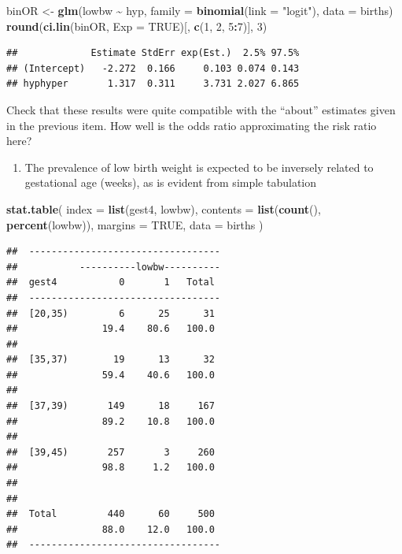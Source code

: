 \documentclass[
]{book}
\newenvironment{Shaded}{\begin{snugshade}}{\end{snugshade}}
\newcommand{\AttributeTok}[1]{\textcolor[rgb]{0.13,0.29,0.53}{#1}}
\newcommand{\ConstantTok}[1]{\textcolor[rgb]{0.56,0.35,0.01}{#1}}
\newcommand{\DecValTok}[1]{\textcolor[rgb]{0.00,0.00,0.81}{#1}}
\newcommand{\FunctionTok}[1]{\textcolor[rgb]{0.13,0.29,0.53}{\textbf{#1}}}
\newcommand{\NormalTok}[1]{#1}
\newcommand{\OtherTok}[1]{\textcolor[rgb]{0.56,0.35,0.01}{#1}}
\newcommand{\SpecialCharTok}[1]{\textcolor[rgb]{0.81,0.36,0.00}{\textbf{#1}}}
\newcommand{\StringTok}[1]{\textcolor[rgb]{0.31,0.60,0.02}{#1}}
\providecommand{\tightlist}{%
  \setlength{\itemsep}{0pt}\setlength{\parskip}{0pt}}
\begin{document}
\begin{Shaded}
\begin{Highlighting}[]
\NormalTok{binOR }\OtherTok{\textless{}{-}} \FunctionTok{glm}\NormalTok{(lowbw }\SpecialCharTok{\textasciitilde{}}\NormalTok{ hyp, }\AttributeTok{family =} \FunctionTok{binomial}\NormalTok{(}\AttributeTok{link =} \StringTok{"logit"}\NormalTok{), }\AttributeTok{data =}\NormalTok{ births)}
\FunctionTok{round}\NormalTok{(}\FunctionTok{ci.lin}\NormalTok{(binOR, }\AttributeTok{Exp =} \ConstantTok{TRUE}\NormalTok{)[, }\FunctionTok{c}\NormalTok{(}\DecValTok{1}\NormalTok{, }\DecValTok{2}\NormalTok{, }\DecValTok{5}\SpecialCharTok{:}\DecValTok{7}\NormalTok{)], }\DecValTok{3}\NormalTok{)}
\end{Highlighting}
\end{Shaded}

\begin{verbatim}
##             Estimate StdErr exp(Est.)  2.5% 97.5%
## (Intercept)   -2.272  0.166     0.103 0.074 0.143
## hyphyper       1.317  0.311     3.731 2.027 6.865
\end{verbatim}

Check that these results were quite compatible with the
``about'' estimates given in the previous item.
How well is the odds ratio approximating the risk ratio here?

\begin{enumerate}
\def\labelenumi{\arabic{enumi}.}
\setcounter{enumi}{2}
\tightlist
\item
  The prevalence of low birth weight is expected to be inversely related
  to gestational age (weeks), as is evident from simple tabulation
\end{enumerate}

\begin{Shaded}
\begin{Highlighting}[]
\FunctionTok{stat.table}\NormalTok{(}
  \AttributeTok{index =} \FunctionTok{list}\NormalTok{(gest4, lowbw),}
  \AttributeTok{contents =} \FunctionTok{list}\NormalTok{(}\FunctionTok{count}\NormalTok{(), }\FunctionTok{percent}\NormalTok{(lowbw)),}
  \AttributeTok{margins =} \ConstantTok{TRUE}\NormalTok{, }\AttributeTok{data =}\NormalTok{ births}
\NormalTok{)}
\end{Highlighting}
\end{Shaded}

\begin{verbatim}
##  ---------------------------------- 
##           ----------lowbw---------- 
##  gest4           0       1   Total  
##  ---------------------------------- 
##  [20,35)         6      25      31  
##               19.4    80.6   100.0  
##                                     
##  [35,37)        19      13      32  
##               59.4    40.6   100.0  
##                                     
##  [37,39)       149      18     167  
##               89.2    10.8   100.0  
##                                     
##  [39,45)       257       3     260  
##               98.8     1.2   100.0  
##                                     
##                                     
##  Total         440      60     500  
##               88.0    12.0   100.0  
##  ----------------------------------
\end{verbatim}
\end{document}

